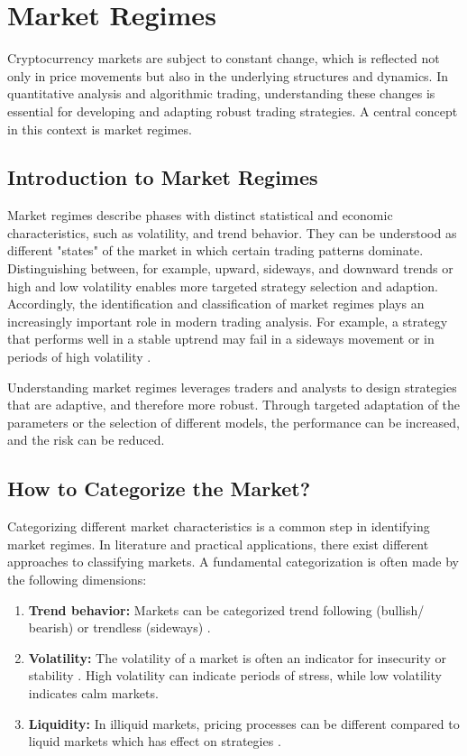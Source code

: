 \section{Market Regimes}
\label{chap:market-regimes}

Cryptocurrency markets are subject to constant change, which is reflected not only in price movements but also in the underlying structures and dynamics.
In quantitative analysis and algorithmic trading, understanding these changes is essential for developing and adapting robust trading strategies.
A central concept in this context is market regimes.

\subsection{Introduction to Market Regimes}

Market regimes describe phases with distinct statistical and economic characteristics, such as volatility, and trend behavior.
They can be understood as different "states" of the market in which certain trading patterns dominate.
Distinguishing between, for example, upward, sideways, and downward trends or high and low volatility enables more targeted strategy selection and adaption.
Accordingly, the identification and classification of market regimes plays an increasingly important role in modern trading analysis.
For example, a strategy that performs well in a stable uptrend may fail in a sideways movement or in periods of high volatility \cite{macrosynergy-market-regime-introduction}.

Understanding market regimes leverages traders and analysts to design strategies that are adaptive, and therefore more robust.
Through targeted adaptation of the parameters or the selection of different models, the performance can be increased, and the risk can be reduced.

\subsection{How to Categorize the Market?}
\label{chap:market-regime-categories}

Categorizing different market characteristics is a common step in identifying market regimes.
In literature and practical applications, there exist different approaches to classifying markets.
A fundamental categorization is often made by the following dimensions:

\begin{enumerate}
    \item \textbf{Trend behavior:} Markets can be categorized trend following (bullish/ bearish) or trendless (sideways) \cite{regime-trend}.
    \item \textbf{Volatility:} The volatility of a market is often an indicator for insecurity or stability \cite{regime-vola}.
    High volatility can indicate periods of stress, while low volatility indicates calm markets.
    \item \textbf{Liquidity:} In illiquid markets, pricing processes can be different compared to liquid markets which has effect on strategies \cite{regime-liq}.
\end{enumerate}

